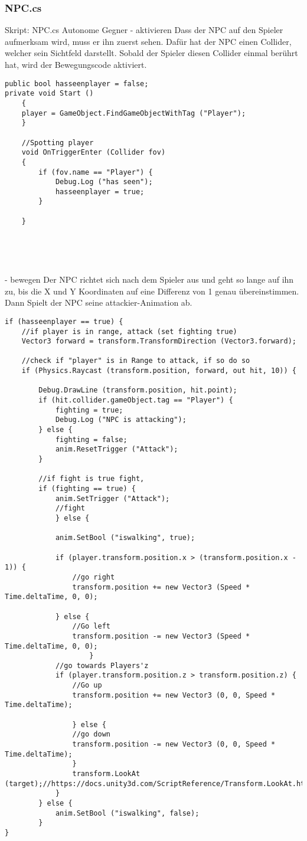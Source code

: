 \subsubsection{NPC.cs}
Skript: NPC.cs
Autonome Gegner
- aktivieren
Dass der NPC auf den Spieler aufmerksam wird, muss er ihn zuerst sehen.
Dafür hat der NPC einen Collider, welcher sein Sichtfeld darstellt.
Sobald der Spieler diesen Collider einmal berührt hat, wird der Bewegungscode aktiviert.
\begin{lstlisting}
public bool hasseenplayer = false;
private void Start ()
	{
	player = GameObject.FindGameObjectWithTag ("Player");
	}
	
	//Spotting player
	void OnTriggerEnter (Collider fov)
	{	
		if (fov.name == "Player") {
			Debug.Log ("has seen");
			hasseenplayer = true;
		}

	}
	

	


\end{lstlisting}
- bewegen
Der NPC richtet sich nach dem Spieler aus und geht so lange auf ihn zu, bis die X und Y Koordinaten auf eine Differenz von 1 genau übereinstimmen.
Dann Spielt der NPC seine attackier-Animation ab.
\begin{lstlisting}
if (hasseenplayer == true) {	
	//if player is in range, attack (set fighting true)
	Vector3 forward = transform.TransformDirection (Vector3.forward);

	//check if "player" is in Range to attack, if so do so
	if (Physics.Raycast (transform.position, forward, out hit, 10)) {	

		Debug.DrawLine (transform.position, hit.point);
		if (hit.collider.gameObject.tag == "Player") {
			fighting = true;
			Debug.Log ("NPC is attacking");
		} else {
			fighting = false;
			anim.ResetTrigger ("Attack");
		}

		//if fight is true fight,
		if (fighting == true) {
			anim.SetTrigger ("Attack");
			//fight
			} else {
				
			anim.SetBool ("iswalking", true);
					
			if (player.transform.position.x > (transform.position.x - 1)) {
				//go right
				transform.position += new Vector3 (Speed * Time.deltaTime, 0, 0);
            		
			} else {
				//Go left
				transform.position -= new Vector3 (Speed * Time.deltaTime, 0, 0);
					}
			//go towards Players'z
			if (player.transform.position.z > transform.position.z) {
				//Go up
				transform.position += new Vector3 (0, 0, Speed * Time.deltaTime);
            		
				} else {
				//go down
				transform.position -= new Vector3 (0, 0, Speed * Time.deltaTime);
				}
				transform.LookAt (target);//https://docs.unity3d.com/ScriptReference/Transform.LookAt.html
			}
		} else {
			anim.SetBool ("iswalking", false);
		}
}

\end{lstlisting}
